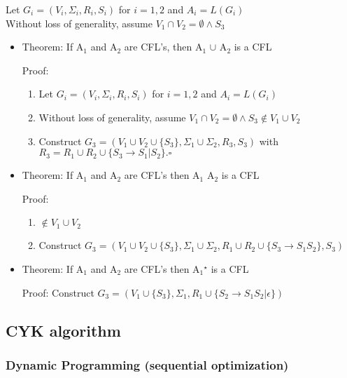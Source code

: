 \documentclass[11pt]{article}
\begin{document}
    Let $G_i = (V_i, \Sigma_i, R_i, S_i)$ for $i=1,2$ and $A_i = L(G_i)$ \\
    Without loss of generality, assume $V_1 \cap V_2 = \emptyset \wedge
    S_3$
    
\begin{itemize}

\item Theorem: If A$_1$ and A$_2$ are CFL's, then A$_1$ $\cup$ A$_2$ is a CFL\\
\label{sec-3.7.1.1}

Proof:
\begin{enumerate}
\item Let $G_i = (V_i, \Sigma_i, R_i, S_i)$ for $i=1,2$ and $A_i = L(G_i)$
\item Without loss of generality, assume $V_1 \cap V_2 = \emptyset \wedge S_3 \notin V_1 \cup V_2$
\item Construct $G_3 = (V_1 \cup V_2 \cup \{S_3\}, \Sigma_1 \cup
       \Sigma_2, R_3, S_3)$ with $R_3= R_1 \cup R_2 \cup \{S_3 \rightarrow S_1|S_2\}. \square$
\end{enumerate}

\item Theorem: If A$_1$ and A$_2$ are CFL's then A$_1$ \cdot A$_2$ is a CFL\\
\label{sec-3.7.1.2}

     Proof:     
\begin{enumerate}
\item $\notin V_1 \cup V_2$
\item Construct $G_3 = (V_1 \cup V_2 \cup \{S_3\}, \Sigma_1 \cup
        \Sigma_2, R_1 \cup R_2 \cup \{S_3 \rightarrow S_1 S_2\}, S_3)$
\end{enumerate}

\item Theorem: If A$_1$ and A$_2$ are CFL's then  A$_1$$^{\star}$ is a CFL\\
\label{sec-3.7.1.3}

     Proof:
     Construct $G_3 = (V_1 \cup \{S_3\}, \Sigma_1, R_1 \cup \{S_2 \rightarrow S_1 S_2 | \epsilon \})$
\end{itemize} %
\subsection{CYK algorithm}
\label{sec-3.8}

\subsubsection{Dynamic Programming (sequential optimization)}
\label{sec-3.8.1}
\end{document}
